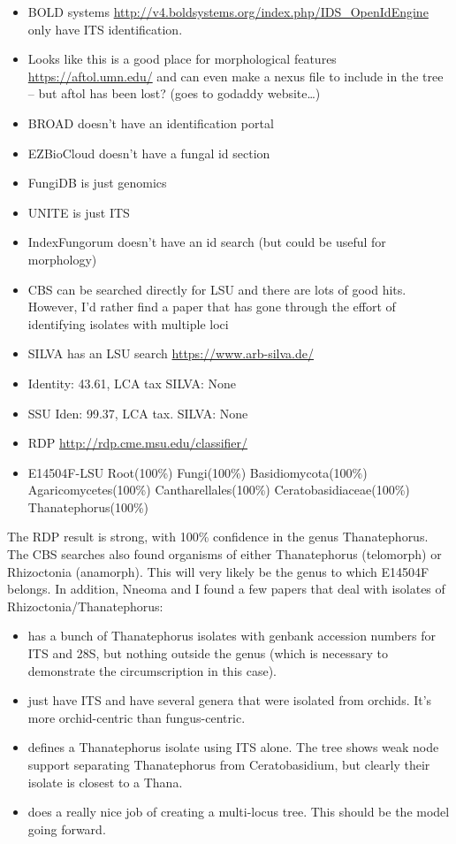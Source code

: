 \documentclass[11pt,]{article}
\providecommand{\tightlist}{%
  \setlength{\itemsep}{0pt}\setlength{\parskip}{0pt}}
\begin{document}
\begin{itemize}
\tightlist
\item
  BOLD systems
  \url{http://v4.boldsystems.org/index.php/IDS_OpenIdEngine} only have
  ITS identification.
\item
  Looks like this is a good place for morphological features
  \url{https://aftol.umn.edu/} and can even make a nexus file to include
  in the tree -- but aftol has been lost? (goes to godaddy
  website\ldots{})
\item
  BROAD doesn't have an identification portal
\item
  EZBioCloud doesn't have a fungal id section
\item
  FungiDB is just genomics
\item
  UNITE is just ITS
\item
  IndexFungorum doesn't have an id search (but could be useful for
  morphology)
\item
  CBS can be searched directly for LSU and there are lots of good hits.
  However, I'd rather find a paper that has gone through the effort of
  identifying isolates with multiple loci
\item
  SILVA has an LSU search \url{https://www.arb-silva.de/}
\item
  Identity: 43.61, LCA tax SILVA: None
\item
  SSU Iden: 99.37, LCA tax. SILVA: None
\item
  RDP \url{http://rdp.cme.msu.edu/classifier/}
\item
  E14504F-LSU Root(100\%) Fungi(100\%) Basidiomycota(100\%)
  Agaricomycetes(100\%) Cantharellales(100\%) Ceratobasidiaceae(100\%)
  Thanatephorus(100\%)
\end{itemize}

The RDP result is strong, with 100\% confidence in the genus
Thanatephorus. The CBS searches also found organisms of either
Thanatephorus (telomorph) or Rhizoctonia (anamorph). This will very
likely be the genus to which E14504F belongs. In addition, Nneoma and I
found a few papers that deal with isolates of Rhizoctonia/Thanatephorus:

\begin{itemize}
\tightlist
\item
  \citep{gonzalez_ribosomal_2001} has a bunch of Thanatephorus isolates
  with genbank accession numbers for ITS and 28S, but nothing outside
  the genus (which is necessary to demonstrate the circumscription in
  this case).
\item
  \citep{tupac_otero_diversity_2002} just have ITS and have several
  genera that were isolated from orchids. It's more orchid-centric than
  fungus-centric.
\item
  \citep{lopez-chavez_proteomic_2016} defines a Thanatephorus isolate
  using ITS alone. The tree shows weak node support separating
  Thanatephorus from Ceratobasidium, but clearly their isolate is
  closest to a Thana.
\item
  \citep{gonzalez_phylogenetic_2016} does a really nice job of creating
  a multi-locus tree. This should be the model going forward.
\end{itemize}
\end{document}

